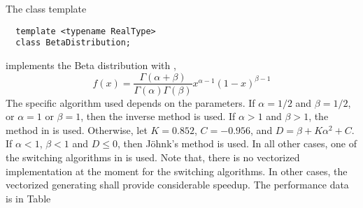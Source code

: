 The class template
\begin{Verbatim}
  template <typename RealType>
  class BetaDistribution;
\end{Verbatim}
implements the Beta distribution with \pdf,
\begin{equation*}
  f(x) = \frac{\Gamma(\alpha + \beta)}{\Gamma(\alpha)\Gamma(\beta)}
  x^{\alpha - 1}(1 - x)^{\beta - 1}
\end{equation*}
The specific algorithm used depends on the parameters. If $\alpha = 1/2$ and
$\beta = 1/2$, or $\alpha = 1$ or $\beta = 1$, then the inverse method is used.
If $\alpha > 1$ and $\beta > 1$, the method in \textcite{Cheng:1978jl} is used.
Otherwise, let $K = 0.852$, $C = -0.956$, and $D = \beta + K\alpha^2 + C$. If
$\alpha < 1$, $\beta < 1$ and $D \le 0$, then Jöhnk's method
\parencite[sec.~3.5]{Devroye:1986gi} is used. In all other cases, one of the
switching algorithms in \textcite{Atkinson:1979es} is used. Note that, there is
no vectorized implementation at the moment for the switching algorithms. In
other cases, the vectorized generating shall provide considerable speedup. The
performance data is in Table~
